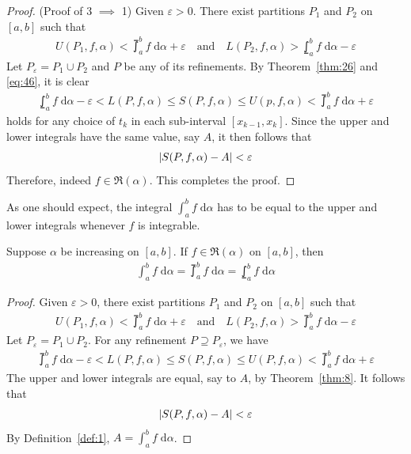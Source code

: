\documentclass[thmcnt=section, 12pt]{my-elegantbook}
\begin{document}
\begin{proof}
    (Proof of 3 $\implies$ 1) Given $\varepsilon > 0$. There exist partitions $P_1$ and $P_2$ on $[a, b]$ such that
    \begin{align*}
        U(P_1,f,\alpha) < \upint_a^b f \; \mathrm{d}\alpha + \varepsilon
        \quad \text{and} \quad
        L(P_2,f,\alpha) > \lowint_a^b f \; \mathrm{d}\alpha - \varepsilon
    \end{align*}
    Let $P_\varepsilon = P_1 \cup P_2$ and $P$ be any of its refinements. By Theorem~\ref{thm:26} and \eqref{eq:46}, it is clear
    \begin{align*}
        \lowint_a^b f \; \mathrm{d}\alpha - \varepsilon
        < L(P,f,\alpha)
        \leq S(P,f,\alpha)
        \leq U(p,f,\alpha)
        < \upint_a^b f \; \mathrm{d}\alpha + \varepsilon
    \end{align*}
    holds for any choice of $t_k$ in each sub-interval $[x_{k-1}, x_k]$. Since the upper and lower integrals have the same value, say $A$, it then follows that
    \begin{align*}
        \left\lvert S(P,f,\alpha) - A \right\rvert < \varepsilon
    \end{align*}
    Therefore, indeed $f \in \mathfrak{R}(\alpha)$. This completes the proof.
\end{proof}

As one should expect, the integral $\int_{a}^{b} f \; \mathrm{d}\alpha$ has to be equal to the upper and lower integrals whenever $f$ is integrable.

\begin{corollary}
    Suppose $\alpha$ be increasing on $[a, b]$. If $f \in \mathfrak{R}(\alpha)$ on $[a, b]$, then
    \begin{align*}
        \int_{a}^{b} f \; \mathrm{d}\alpha
        = \upint_{a}^{b} f \; \mathrm{d}\alpha
        = \lowint_{a}^{b} f \; \mathrm{d}\alpha
    \end{align*}
\end{corollary}

\begin{proof}
    Given $\varepsilon > 0$, there exist partitions $P_1$ and $P_2$ on $[a, b]$ such that
    \begin{align*}
        U(P_1,f,\alpha) < \upint_{a}^{b} f \; \mathrm{d}\alpha + \varepsilon
        \quad\text{and}\quad
        L(P_2,f,\alpha) > \upint_{a}^{b} f \; \mathrm{d}\alpha - \varepsilon
    \end{align*}
    Let $P_\varepsilon = P_1 \cup P_2$. For any refinement $P \supseteq P_\varepsilon$, we have
    \begin{align*}
        \upint_{a}^{b} f \; \mathrm{d}\alpha - \varepsilon
        < L(P,f,\alpha)
        \leq S(P,f,\alpha)
        \leq U(P,f,\alpha)
        < \upint_{a}^{b} f \; \mathrm{d}\alpha + \varepsilon
    \end{align*}
    The upper and lower integrals are equal, say to $A$, by Theorem~\ref{thm:8}. It follows that
    \begin{align*}
        \left\lvert S(P,f,\alpha) - A \right\rvert < \varepsilon
    \end{align*}
    By Definition~\ref{def:1}, $A = \int_{a}^{b} f \; \mathrm{d}\alpha$.
\end{proof}
\end{document}
